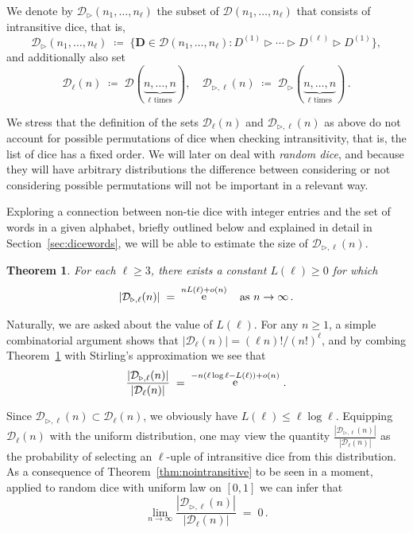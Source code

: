 \documentclass[reqno,a4paper,11pt]{amsart}
\newcommand{\btt}{\triangleright}
\newtheorem{theorem}[lemma]{Theorem}
\theoremstyle{remark}
\newcommand{\mc}[1]{{\mathcal #1}}
\newcommand{\mb}[1]{{\mathbf #1}}
\newcommand{\Gs}[1]{\mbox{}\marginpar{\tiny\raggedright\hspace{0pt}{{\bf G:} {\color{violet}#1}}}}
\numberwithin{equation}{section}
\DeclareMathOperator{\ee}{\rm e}
\begin{document}
We denote by $\mc D_\btt (n_1,\hdots,n_\ell)$ the subset of $\mc D (n_1,\hdots,n_\ell)$ that consists of intransitive dice, that is,
%
$$
\mc D_{\btt}(n_1,\hdots, n_\ell)\;\coloneqq\; \big\{\mb D\in \mc D(n_1,\hdots,n_\ell): D^{(1)}\btt \cdots \btt D^{(\ell)}\btt D^{(1)}\big\},
$$
%
and additionally also set
%
\begin{equation}\label{eq:defDellbtt}
\mc D_\ell(n)\;\coloneqq\;
\mc D(\underbrace{n,\hdots, n}_{\ell \text{ times}}),\quad \mc D_{\btt,\ell}(n)\;\coloneqq\;
\mc D_\btt(\underbrace{n,\hdots, n}_{\ell \text{ times}})\,.
\end{equation}
%

We stress that the definition of the sets $\mc D_\ell(n)$ and $\mc D_{\btt,\ell}(n)$ as above do not account for possible permutations of dice when checking intransitivity, that is, the list of dice has a fixed order. We will later on deal with {\it random dice}, and because they will have arbitrary distributions the difference between considering or not considering possible permutations will not be important in a relevant way.


Exploring a connection between non-tie dice with integer entries and the set of words in a given alphabet, briefly outlined below and explained in detail in Section~\ref{sec:dicewords}, we will be able to estimate the size of $\mc D_{\btt, \ell}(n)$.
%
\begin{theorem}\label{thm2}
For each $\ell\geq 3$, there exists a constant $L(\ell)\geq 0$ for which
%
$$
|\mc D_{\btt,\ell}(n)|\;=\;\ee^{nL(\ell)+o(n)}\quad \text{as }n\to \infty\,.
$$
%
\end{theorem}

Naturally, we are asked about the value of $L(\ell)$. For any $n\geq 1$, a simple combinatorial argument shows that $|\mc D_{\ell}(n)|=(\ell n)!/(n!)^\ell$, and by combing Theorem~\ref{thm2} with Stirling's approximation we see that
%
\begin{equation}\label{eq:subexpondecay}
\frac{|\mc D_{\btt,\ell}(n)|}{|\mc D_{\ell}(n)|}\;=\; \ee^{-n(\ell\log \ell-L(\ell))+o(n) } \,.
\end{equation}


Since $\mc D_{\btt,\ell}(n) \subset \mc D_\ell(n)$, we obviously have $L(\ell)\leq \ell\log \ell$. Equipping $\mc D_{\ell}(n)$ with the uniform distribution, one may view the quantity $\frac{|\mc D_{\btt,\ell}(n)|}{|\mc D_\ell(n)|}$ as the probability of selecting an $\ell$-uple of intransitive dice from this distribution. As a consequence of Theorem~\ref{thm:nointransitive} to be seen in a moment, applied to random dice with uniform law on $[0,1]$ we can infer that
%
$$
\lim_{n\to \infty}\frac{|\mc D_{\btt,\ell}(n)|}{|\mc D_{\ell}(n)|}\;=\;0\,.
$$
\end{document}
